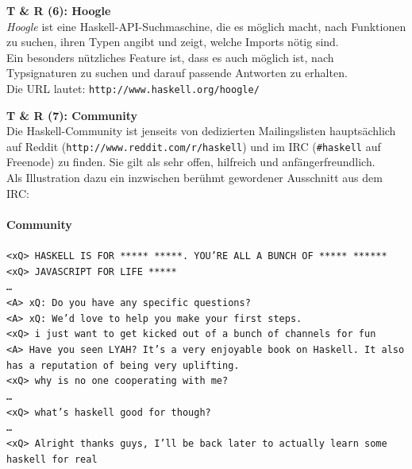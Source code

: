 \documentclass{beamer}
\begin{document}
  \begin{frame}
    \begin{center}
    \Large\textbf{T \& R (6): Hoogle}\\ \bigskip \normalsize
    \emph{Hoogle} ist eine Haskell-API-Suchmaschine, die es möglich macht, nach Funktionen zu suchen, ihren Typen angibt und zeigt, welche Imports nötig sind.\\ Ein besonders nützliches Feature ist, dass es auch möglich ist, nach Typsignaturen zu suchen und darauf passende Antworten zu erhalten.\\ \bigskip
    Die URL lautet: \texttt{http://www.haskell.org/hoogle/}
    \end{center}
  \end{frame}
  
  
  \begin{frame}
    \begin{center}
    \Large\textbf{T \& R (7): Community}\\ \bigskip \normalsize
    Die Haskell-Community ist jenseits von dedizierten Mailingslisten hauptsächlich auf Reddit (\texttt{http://www.reddit.com/r/haskell}) und im IRC (\texttt{\#haskell} auf Freenode) zu finden. Sie gilt als sehr offen, hilfreich und anfängerfreundlich.\\\bigskip
    Als Illustration dazu ein inzwischen berühmt gewordener Ausschnitt aus dem IRC:
    \end{center}
  \end{frame}
  
  
  \begin{frame}

    \framesubtitle{Community} \small
    \texttt{<xQ> HASKELL IS FOR ***** *****. YOU'RE ALL A BUNCH OF ***** ******}\\
    \texttt{<xQ> JAVASCRIPT FOR LIFE *****}\\
    \pause
    \texttt{\dots}\\
    \texttt{<A> xQ: Do you have any specific questions?}\\
    \texttt{<A> xQ: We'd love to help you make your first steps.}\\
    \pause
    \texttt{<xQ> i just want to get kicked out of a bunch of channels for fun}\\
    \texttt{<A> Have you seen LYAH? It's a very enjoyable book on Haskell. It also has a reputation of being very uplifting.}\\
    \texttt{<xQ> why is no one cooperating with me?}\\
    \pause
    \texttt{\dots}\\
    \texttt{<xQ> what's haskell good for though?}\\
    \texttt{\dots}\\
    \texttt{<xQ> Alright thanks guys, I'll be back later to actually learn some haskell for real}\\
  \end{frame}
\end{document}
